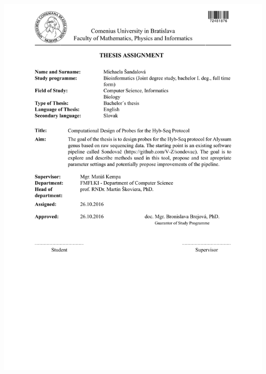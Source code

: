 \documentclass[12pt, oneside]{book}
\begin{document}
\newpage 
\thispagestyle{empty}
\hspace{-2cm}\includegraphics[width=1.1\textwidth]{images/assignment_sandalova.pdf}
\end{document}

